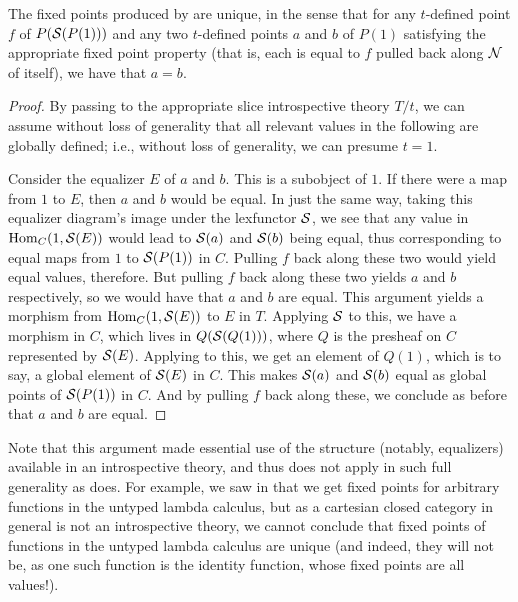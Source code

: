 \begin{theorem}\label{UniqueFixedPoints}
The fixed points produced by  are unique, in the sense that for any $t$-defined point $f$ of $P(\mathcal{S}(P(1)))$ and any two $t$-defined points $a$ and $b$ of $P(1)$ satisfying the appropriate fixed point property (that is, each is equal to $f$ pulled back along $\mathcal{N}$ of itself), we have that $a = b$.
\end{theorem}
\begin{proof}
By passing to the appropriate slice introspective theory $T/t$, we can assume without loss of generality that all relevant values in the following are globally defined; i.e., without loss of generality, we can presume $t = 1$.

Consider the equalizer $E$ of $a$ and $b$. This is a subobject of $1$. If there were a map from $1$ to $E$, then $a$ and $b$ would be equal. In just the same way, taking this equalizer diagram's image under the lexfunctor $\mathcal{S}$, we see that any value in $\operatorname{Hom}_C(1, \mathcal{S}(E))$ would lead to $\mathcal{S}(a)$ and $\mathcal{S}(b)$ being equal, thus corresponding to equal maps from $1$ to $\mathcal{S}(P(1))$ in $C$. Pulling $f$ back along these two would yield equal values, therefore. But pulling $f$ back along these two yields $a$ and $b$ respectively, so we would have that $a$ and $b$ are equal. This argument yields a morphism from $\operatorname{Hom}_C(1, \mathcal{S}(E))$ to $E$ in $T$. Applying $\mathcal{S}$ to this, we have a morphism in $C$, which lives in $Q(\mathcal{S}(Q(1)))$, where $Q$ is the presheaf on $C$ represented by $\mathcal{S}(E)$. Applying  to this, we get an element of $Q(1)$, which is to say, a global element of $\mathcal{S}(E)$ in $C$. This makes $\mathcal{S}(a)$ and $\mathcal{S}(b)$ equal as global points of $\mathcal{S}(P(1))$ in $C$. And by pulling $f$ back along these, we conclude as before that $a$ and $b$ are equal. 
\end{proof}

\begin{observation}
Note that this argument made essential use of the structure (notably, equalizers) available in an introspective theory, and thus does not apply in such full generality as  does. For example, we saw in  that we get fixed points for arbitrary functions in the untyped lambda calculus, but as a cartesian closed category in general is not an introspective theory, we cannot conclude that fixed points of functions in the untyped lambda calculus are unique (and indeed, they will not be, as one such function is the identity function, whose fixed points are all values!).
\end{observation}

